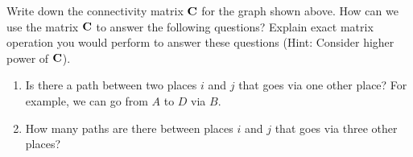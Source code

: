 \begin{enumerate}[resume]
    Write down the connectivity matrix $\mathbf{C}$ for the graph shown above. How can we use the matrix $\mathbf{C}$ to answer the following questions? Explain exact matrix operation you would perform to answer these questions (Hint: Consider higher power of $\mathbf{C}$).
    \begin{enumerate}
        \item Is there a path between two places $i$ and $j$ that goes via one other place? For example, we can go from $A$ to $D$ via $B$.
        \item How many paths are there between places $i$ and $j$ that goes via three other places?
    \end{enumerate}
\end{enumerate}